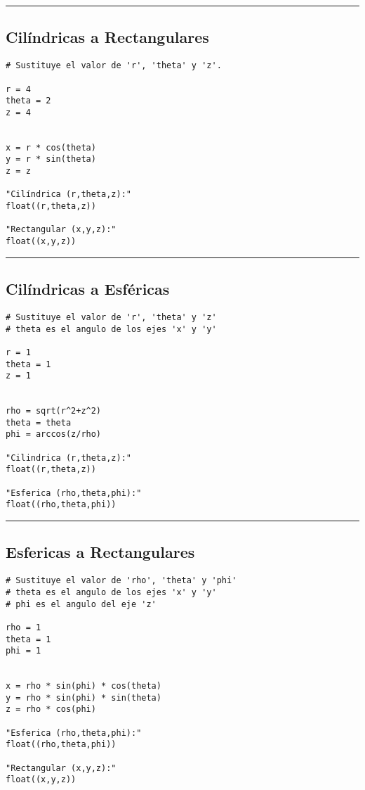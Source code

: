 \documentclass{article}
\begin{document}
\noindent\rule{\textwidth}{0.5pt}

\newpage 

\subsection{Cilíndricas a Rectangulares}
\label{sec:org3a59829}
\begin{verbatim}
# Sustituye el valor de 'r', 'theta' y 'z'.

r = 4
theta = 2
z = 4


x = r * cos(theta)
y = r * sin(theta)
z = z

"Cilíndrica (r,theta,z):"
float((r,theta,z))

"Rectangular (x,y,z):"
float((x,y,z))
\end{verbatim}

\noindent\rule{\textwidth}{0.5pt}

\newpage 

\subsection{Cilíndricas a Esféricas}
\label{sec:org87e1f40}
\begin{verbatim}
# Sustituye el valor de 'r', 'theta' y 'z'
# theta es el angulo de los ejes 'x' y 'y'

r = 1
theta = 1
z = 1


rho = sqrt(r^2+z^2) 
theta = theta
phi = arccos(z/rho)

"Cilindrica (r,theta,z):"
float((r,theta,z))

"Esferica (rho,theta,phi):"
float((rho,theta,phi))
\end{verbatim}

\noindent\rule{\textwidth}{0.5pt}

\newpage

\subsection{Esfericas a Rectangulares}
\label{sec:org4523282}
\begin{verbatim}
# Sustituye el valor de 'rho', 'theta' y 'phi'
# theta es el angulo de los ejes 'x' y 'y'
# phi es el angulo del eje 'z'

rho = 1
theta = 1
phi = 1


x = rho * sin(phi) * cos(theta)
y = rho * sin(phi) * sin(theta)
z = rho * cos(phi)

"Esferica (rho,theta,phi):"
float((rho,theta,phi))

"Rectangular (x,y,z):"
float((x,y,z))
\end{verbatim}
\end{document}

